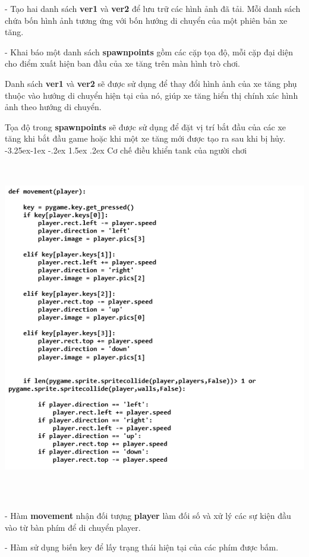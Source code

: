 \documentclass[a4paper]{article}
\makeatletter
\newcounter {subsubsubsection}[subsubsection]
\newcommand\subsubsubsection{\@startsection{subsubsubsection}{4}{\z@}%
                                     {-3.25ex\@plus -1ex \@minus -.2ex}%
                                     {1.5ex \@plus .2ex}%
                                     {\normalfont\normalsize\bfseries}}
\makeatother
\begin{document}
- Tạo hai danh sách \textbf{ver1} và \textbf{ver2} để lưu trữ các hình
ảnh đã tải. Mỗi danh sách chứa bốn hình ảnh tương ứng với bốn hướng di
chuyển của một phiên bản xe tăng.

- Khai báo một danh sách \textbf{spawnpoints} gồm các cặp tọa độ, mỗi
cặp đại diện cho điểm xuất hiện ban đầu của xe tăng trên màn hình trò
chơi.

Danh sách \textbf{ver1} và \textbf{ver2} sẽ được sử dụng để thay đổi
hình ảnh của xe tăng phụ thuộc vào hướng di chuyển hiện tại của nó, giúp
xe tăng hiển thị chính xác hình ảnh theo hướng di chuyển.

Tọa độ trong \textbf{spawnpoints} sẽ được sử dụng để đặt vị trí bắt đầu
của các xe tăng khi bắt đầu game hoặc khi một xe tăng mới được tạo ra
sau khi bị hủy.
\newpage
\subsubsubsection{Cơ chế điều khiển tank của người chơi}
\includegraphics[width=7in,height=6in]{image44_1.png}

- Hàm \textbf{movement} nhận đối tượng \textbf{player} làm đối số và xử
lý các sự kiện đầu vào từ bàn phím để di chuyển player.

- Hàm sử dụng biến key để lấy trạng thái hiện tại của các phím được bấm.
\end{document}
